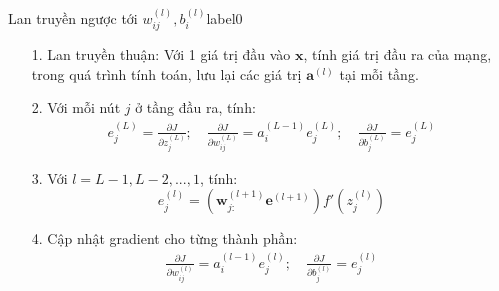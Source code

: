 

\begin{myalg}{{Lan truyền ngược tới} $w_{ij}^{(l)},
b_{i}^{(l)}$}{label0}
\begin{enumerate}
\item[1.] Lan truyền thuận: Với 1 giá trị đầu vào $\mathbf{x}$, tính giá trị đầu
ra của mạng, trong quá trình tính toán, lưu lại các giá trị $\mathbf{a}^{(l)}$ tại mỗi tầng.
\item[2.] Với mỗi nút $j$ ở tầng đầu ra, tính:
\begin{eqnarray}
e_j^{(L)} = \frac{\partial J}{\partial z_j^{(L)}}; \quad
\frac{\partial J}{\partial w_{ij}^{(L)}} = a_i^{(L-1)}e_j^{(L)}; \quad
\frac{\partial J}{\partial b_{j}^{(L)}} = e_j^{(L)}
\end{eqnarray}

\item[3.]  Với $l = L-1, L-2, ..., 1$, tính:
\begin{equation}
e_j^{(l)} = \left( \mathbf{w}_{j:}^{(l+1)} \mathbf{e}^{(l+1)} \right) f'(z_j^{(l)})
\end{equation}

\item[4.] Cập nhật gradient cho từng thành phần:
\begin{eqnarray}
\frac{\partial J}{\partial w_{ij}^{(l)}} = a_i^{(l-1)} e_j^{(l)}; \quad
\frac{\partial J}{\partial b_{j}^{(l)}} = e_j^{(l)}
\end{eqnarray}
\end{enumerate}
\end{myalg}



